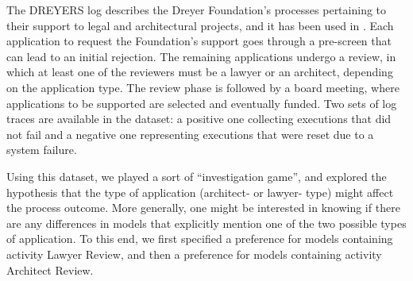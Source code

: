 The DREYERS log describes the Dreyer Foundation’s processes pertaining to their support to legal and architectural projects, and it has been used in \cite{DBLP:conf/ssci/DeboisS15,DBLP:conf/bpm/SlaatsDB21}. Each application to request the Foundation's support goes through a pre-screen that can lead to an initial rejection. The remaining applications undergo a review, in which at least one of the reviewers must be a lawyer or an architect, depending on the application type. The review phase is followed by a board meeting, where applications to be supported are selected and eventually funded. %
Two sets of log traces are available in the dataset: a positive one collecting executions that did not fail and a negative one representing executions that were reset due to a system failure. %

Using this dataset, we played a sort of ``investigation game'', and explored the hypothesis that the type of application (architect- or lawyer- type) might affect the process outcome. More generally, one might be interested in knowing if there are any differences in models that explicitly mention one of the two possible types of application.
To this end, we first specified a preference for models containing activity \textsf{Lawyer Review}, and then a preference for models containing activity \textsf{Architect Review}.

